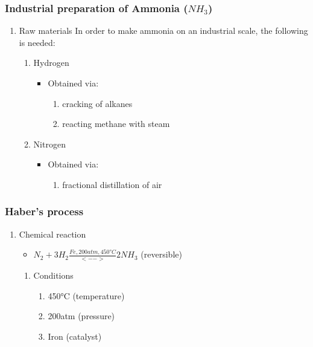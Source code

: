 \documentclass[11pt]{article}
\begin{document}
\subsubsection{Industrial preparation of Ammonia (\(NH_3\))}
\label{sec:org40b56a4}
\begin{enumerate}
\item Raw materials
\label{sec:orge5474cd}
In order to make ammonia on an industrial scale, the following is needed:
\begin{enumerate}
\item Hydrogen
\begin{itemize}
\item Obtained via:
\begin{enumerate}
\item cracking of alkanes
\item reacting methane with steam
\end{enumerate}
\end{itemize}
\item Nitrogen
\begin{itemize}
\item Obtained via:
\begin{enumerate}
\item fractional distillation of air
\end{enumerate}
\end{itemize}
\end{enumerate}
\end{enumerate}
\subsubsection{Haber's process}
\label{sec:org0066bec}
\begin{enumerate}
\item Chemical reaction
\label{sec:org3c3d4c4}
\begin{itemize}
\item \(N_2+3H_2 \frac{Fe, 200atm, 450°C}{<-->}2NH_3\) (reversible)
\end{itemize}
\begin{enumerate}
\item Conditions
\label{sec:org7280bfa}
\begin{enumerate}
\item 450°C (temperature)
\item 200atm (pressure)
\item Iron (catalyst)
\end{enumerate}
\end{enumerate}
\end{enumerate}
\end{document}
